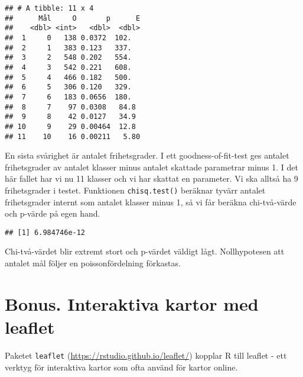 \documentclass[
]{book}
\newenvironment{Shaded}{\begin{snugshade}}{\end{snugshade}}
\newcommand{\AttributeTok}[1]{\textcolor[rgb]{0.77,0.63,0.00}{#1}}
\newcommand{\DecValTok}[1]{\textcolor[rgb]{0.00,0.00,0.81}{#1}}
\newcommand{\FunctionTok}[1]{\textcolor[rgb]{0.00,0.00,0.00}{#1}}
\newcommand{\NormalTok}[1]{#1}
\newcommand{\OtherTok}[1]{\textcolor[rgb]{0.56,0.35,0.01}{#1}}
\newcommand{\SpecialCharTok}[1]{\textcolor[rgb]{0.00,0.00,0.00}{#1}}
\theoremstyle{definition}
\theoremstyle{definition}
\theoremstyle{definition}
\theoremstyle{definition}
\theoremstyle{remark}
\begin{document}
\begin{verbatim}
## # A tibble: 11 x 4
##      Mål     O       p      E
##    <dbl> <int>   <dbl>  <dbl>
##  1     0   138 0.0372  102.  
##  2     1   383 0.123   337.  
##  3     2   548 0.202   554.  
##  4     3   542 0.221   608.  
##  5     4   466 0.182   500.  
##  6     5   306 0.120   329.  
##  7     6   183 0.0656  180.  
##  8     7    97 0.0308   84.8 
##  9     8    42 0.0127   34.9 
## 10     9    29 0.00464  12.8 
## 11    10    16 0.00211   5.80
\end{verbatim}

En sista svårighet är antalet frihetsgrader. I ett goodness-of-fit-test ges antalet frihetsgrader av antalet klasser minus antalet skattade parametrar minus 1. I det här fallet har vi nu 11 klasser och vi har skattat en parameter. Vi ska alltså ha 9 frihetsgrader i testet. Funktionen \texttt{chisq.test()} beräknar tyvärr antalet frihetsgrader internt som antalet klasser minus 1, så vi får beräkna chi-två-värde och p-värde på egen hand.

\begin{Shaded}
\end{Shaded}

\begin{verbatim}
## [1] 6.984746e-12
\end{verbatim}

Chi-två-värdet blir extremt stort och p-värdet väldigt lågt. Nollhypotesen att antalet mål följer en poissonfördelning förkastas.

\hypertarget{bonus.-interaktiva-kartor-med-leaflet}{%
\section{Bonus. Interaktiva kartor med leaflet}\label{bonus.-interaktiva-kartor-med-leaflet}}

Paketet \texttt{leaflet} (\url{https://rstudio.github.io/leaflet/}) kopplar R till leaflet - ett verktyg för interaktiva kartor som ofta använd för kartor online.
\end{document}
